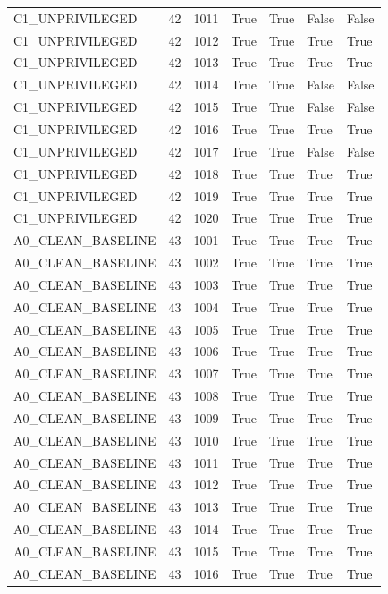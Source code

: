 \documentclass[11pt,a4paper,oneside]{book}
\begin{document}
\begin{longtable}{l l l l l l l}
C1\_UNPRIVILEGED & 42 & 1011 & True & True & False & False \\
C1\_UNPRIVILEGED & 42 & 1012 & True & True & True & True \\
C1\_UNPRIVILEGED & 42 & 1013 & True & True & True & True \\
C1\_UNPRIVILEGED & 42 & 1014 & True & True & False & False \\
C1\_UNPRIVILEGED & 42 & 1015 & True & True & False & False \\
C1\_UNPRIVILEGED & 42 & 1016 & True & True & True & True \\
C1\_UNPRIVILEGED & 42 & 1017 & True & True & False & False \\
C1\_UNPRIVILEGED & 42 & 1018 & True & True & True & True \\
C1\_UNPRIVILEGED & 42 & 1019 & True & True & True & True \\
C1\_UNPRIVILEGED & 42 & 1020 & True & True & True & True \\
A0\_CLEAN\_BASELINE & 43 & 1001 & True & True & True & True \\
A0\_CLEAN\_BASELINE & 43 & 1002 & True & True & True & True \\
A0\_CLEAN\_BASELINE & 43 & 1003 & True & True & True & True \\
A0\_CLEAN\_BASELINE & 43 & 1004 & True & True & True & True \\
A0\_CLEAN\_BASELINE & 43 & 1005 & True & True & True & True \\
A0\_CLEAN\_BASELINE & 43 & 1006 & True & True & True & True \\
A0\_CLEAN\_BASELINE & 43 & 1007 & True & True & True & True \\
A0\_CLEAN\_BASELINE & 43 & 1008 & True & True & True & True \\
A0\_CLEAN\_BASELINE & 43 & 1009 & True & True & True & True \\
A0\_CLEAN\_BASELINE & 43 & 1010 & True & True & True & True \\
A0\_CLEAN\_BASELINE & 43 & 1011 & True & True & True & True \\
A0\_CLEAN\_BASELINE & 43 & 1012 & True & True & True & True \\
A0\_CLEAN\_BASELINE & 43 & 1013 & True & True & True & True \\
A0\_CLEAN\_BASELINE & 43 & 1014 & True & True & True & True \\
A0\_CLEAN\_BASELINE & 43 & 1015 & True & True & True & True \\
A0\_CLEAN\_BASELINE & 43 & 1016 & True & True & True & True \\

\end{longtable}
\end{document}
